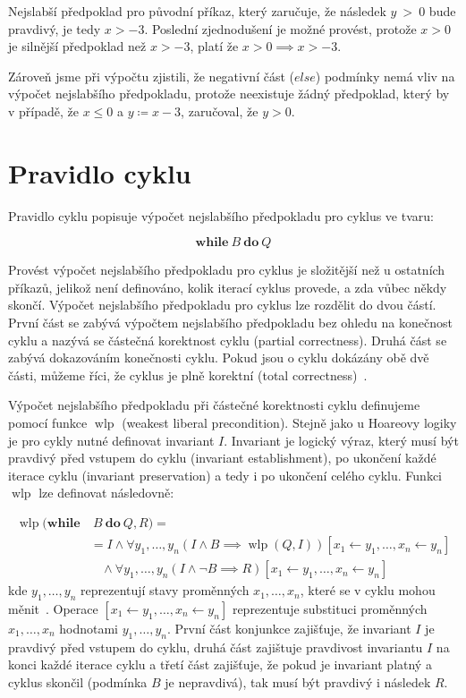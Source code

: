 Nejslabší předpoklad pro původní příkaz,
který zaručuje, že následek $y~>~0$ bude pravdivý, je tedy $x > -3$.
Poslední zjednodušení je možné provést, protože $x > 0$ je silnější předpoklad než $x > -3$,
platí že $x > 0 \implies x > -3$.

Zároveň jsme při výpočtu zjistili, že negativní část ($else$) podmínky nemá vliv na výpočet nejslabšího předpokladu,
protože neexistuje žádný předpoklad, který by v případě, že $x \leq 0$ a $y \coloneqq x - 3$, zaručoval, že $y > 0$.

\section{Pravidlo cyklu}
\label{sec:pravidlo-cyklu}

Pravidlo cyklu popisuje výpočet nejslabšího předpokladu pro cyklus ve tvaru:

\begin{equation*}
    \textbf{while} \ B \ \textbf{do} \ Q
\end{equation*}

Provést výpočet nejslabšího předpokladu pro cyklus je složitější než u ostatních příkazů,
jelikož není definováno, kolik iterací cyklus provede, a zda vůbec někdy skončí.
Výpočet nejslabšího předpokladu pro cyklus lze rozdělit do dvou částí.
První část se zabývá výpočtem nejslabšího předpokladu bez ohledu na konečnost cyklu
a nazývá se částečná korektnost cyklu (partial correctness).
Druhá část se zabývá dokazováním konečnosti cyklu.
Pokud jsou o cyklu dokázány obě dvě části,
můžeme říci, že cyklus je plně korektní (total correctness)~\cite{arusoaie2024wp}.

Výpočet nejslabšího předpokladu při částečné korektnosti cyklu
definujeme pomocí funkce $\operatorname{wlp}$ (weakest liberal precondition).
Stejně jako u Hoareovy logiky je pro cykly nutné definovat invariant $I$.
Invariant je logický výraz, který musí být pravdivý před vstupem do cyklu (invariant establishment),
po ukončení každé iterace cyklu (invariant preservation) a tedy i po ukončení celého cyklu.
Funkci $\operatorname{wlp}$ lze definovat následovně:

\begin{align*}
    \operatorname{wlp}(\textbf{while} & \ B \ \textbf{do} \ Q, R) = \\
        & = I \land \forall y_1,\ldots,y_n \left( I \land B \implies \operatorname{wlp}(Q, I) \right)[x_1 \leftarrow y_1, \ldots, x_n \leftarrow y_n] \\
        & \ \ \ \  \land \forall y_1,\ldots,y_n \left( I \land \neg B \implies R \right)[x_1 \leftarrow y_1, \ldots, x_n \leftarrow y_n]
\end{align*}
kde $y_1, \ldots, y_n$ reprezentují stavy proměnných $x_1, \ldots, x_n$, které se v cyklu mohou měnit~\cite{arusoaie2024wp}.
Operace $[x_1 \leftarrow y_1, \ldots, x_n \leftarrow y_n]$ reprezentuje substituci proměnných $x_1, \ldots, x_n$ hodnotami $y_1, \ldots, y_n$.
První část konjunkce zajišťuje, že invariant $I$ je pravdivý před vstupem do cyklu,
druhá část zajištuje pravdivost invariantu $I$ na konci každé iterace cyklu
a třetí část zajišťuje, že pokud je invariant platný a cyklus skončil (podmínka $B$ je nepravdivá),
tak musí být pravdivý i následek $R$.

